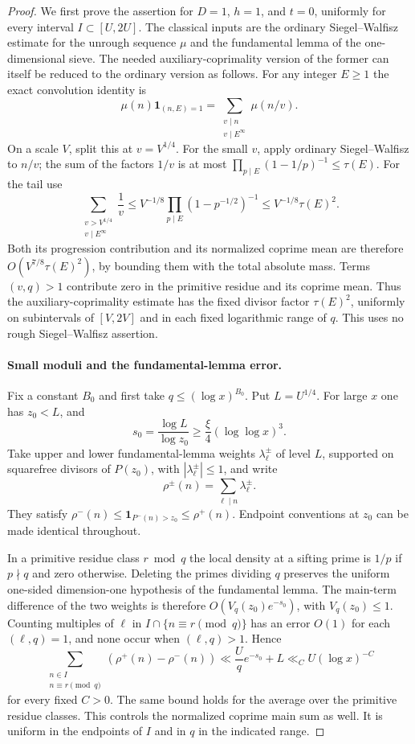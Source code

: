 \documentclass[11pt]{article}
\begin{document}
\begin{proof}
We first prove the assertion for $D=1$, $h=1$, and $t=0$,
uniformly for every interval $I\subset[U,2U]$.
The classical inputs are the ordinary Siegel--Walfisz estimate
for the unrough sequence $\mu$ and the fundamental lemma of
the one-dimensional sieve. The needed auxiliary-coprimality
version of the former can itself be reduced to the ordinary
version as follows.
For any integer $E\ge1$ the exact convolution identity is
\[
 \mu(n)\mathbf1_{(n,E)=1}
       =\sum_{\substack{v\mid n\\v\mid E^\infty}}\mu(n/v).
\]
On a scale $V$, split this at $v=V^{1/4}$.
For the small $v$, apply ordinary Siegel--Walfisz to $n/v$;
the sum of the factors $1/v$ is at most
$\prod_{p\mid E}(1-1/p)^{-1}\le\tau(E)$.
For the tail use
\[
 \sum_{\substack{v>V^{1/4}\\v\mid E^\infty}}\frac1v
 \le V^{-1/8}\prod_{p\mid E}(1-p^{-1/2})^{-1}
 \le V^{-1/8}\tau(E)^2.
\]
Both its progression contribution and its normalized coprime
mean are therefore $O(V^{7/8}\tau(E)^2)$, by bounding them
with the total absolute mass. Terms $(v,q)>1$ contribute zero
in the primitive residue and its coprime mean.
Thus the auxiliary-coprimality estimate has the fixed divisor
factor $\tau(E)^2$, uniformly on subintervals of $[V,2V]$
and in each fixed logarithmic range of $q$.
This uses no rough Siegel--Walfisz assertion.

\paragraph{Small moduli and the fundamental-lemma error.}
Fix a constant $B_0$ and first take $q\le(\log x)^{B_0}$.
Put $L=U^{1/4}$. For large $x$ one has $z_0<L$, and
\[
 s_0=\frac{\log L}{\log z_0}
       \ge\frac{\xi}{4}(\log\log x)^3.
\]
Take upper and lower fundamental-lemma weights $\lambda^\pm_\ell$
of level $L$, supported on squarefree divisors of $P(z_0)$,
with $|\lambda^\pm_\ell|\le1$, and write
\[
 \rho^\pm(n)=\sum_{\ell\mid n}\lambda^\pm_\ell.
\]
They satisfy
$\rho^-(n)\le\mathbf1_{P^-(n)>z_0}\le\rho^+(n)$.
Endpoint conventions at $z_0$ can be made identical throughout.

In a primitive residue class $r\bmod q$ the local density at a
sifting prime is $1/p$ if $p\nmid q$ and zero otherwise.
Deleting the primes dividing $q$ preserves the uniform
one-sided dimension-one hypothesis of the fundamental lemma.
The main-term difference of the two weights is therefore
$O(V_q(z_0)e^{-s_0})$, with $V_q(z_0)\le1$.
Counting multiples of $\ell$ in $I\cap\{n\equiv r\pmod q\}$
has an error $O(1)$ for each $(\ell,q)=1$, and none occur
when $(\ell,q)>1$. Hence
\begin{equation}\label{eq:rough-beta-gap}
 \sum_{\substack{n\in I\\n\equiv r\pmod q}}
              (\rho^+(n)-\rho^-(n))
 \ll \frac Uq e^{-s_0}+L
 \ll_C U(\log x)^{-C}
\end{equation}
for every fixed $C>0$.
The same bound holds for the average over the primitive residue
classes. This controls the normalized coprime main sum as well.
It is uniform in the endpoints of $I$ and in $q$ in the indicated
range.


\end{proof}
\end{document}
